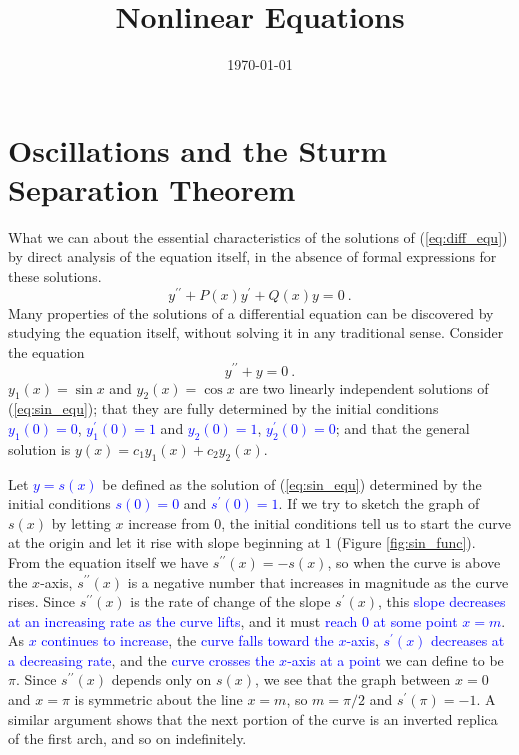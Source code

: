 \documentclass[12pt,a4paper]{article}
\title{Nonlinear Equations}
\author{}
\date{\today}
\begin{document}
\maketitle

\section{Oscillations and the Sturm Separation Theorem}
\cite{george1991differential, simmons2016differential} What we can about the essential characteristics of the solutions of (\ref{eq:diff_equ}) by direct analysis of the equation itself, in the absence of formal expressions for these solutions. 
\begin{equation}
y^{\prime \prime} +P(x) y^\prime +Q(x) y = 0 ~.
\label{eq:diff_equ}
\end{equation}
Many properties of the solutions of a differential equation can be discovered by studying the equation itself, without
solving it in any traditional sense. Consider the equation
\begin{equation}
y^{\prime \prime}  + y = 0 ~.
\label{eq:sin_equ}
\end{equation}
$y_1(x)= \sin x$ and $y_2(x) =\cos x$ are two linearly independent solutions of (\ref{eq:sin_equ}); that they are fully determined by the initial conditions \textcolor{blue}{$y_1(0) = 0$}, \textcolor{blue}{$y_1^\prime(0) = 1$} and \textcolor{blue}{$y_2(0) = 1$}, \textcolor{blue}{$y_2^\prime(0) = 0$}; and that the general solution is $y(x) = c_1y_1(x)+c_2y_2(x)$. 

Let \textcolor{blue}{$y = s(x)$} be defined as the solution of (\ref{eq:sin_equ}) determined by the initial conditions \textcolor{blue}{$s(0) = 0$} and \textcolor{blue}{$s^\prime(0) = 1$}. If we try to sketch the graph of $s(x)$ by letting $x$ increase from $0$, the initial conditions tell us to start the curve at the origin and let it rise with slope beginning at $1$ (Figure \ref{fig:sin_func}). From the equation itself we have $s^{\prime \prime}(x) = -s(x)$, so when the curve is above the $x$-axis, $s^{\prime \prime}(x)$ is a negative number that increases in magnitude as the curve rises. Since $s^{\prime \prime}(x)$ is the rate of change of the slope $s^{\prime}(x)$, this \textcolor{blue}{slope decreases at an increasing rate as the curve lifts}, and it must \textcolor{blue}{reach $0$ at some point $x = m$}. As \textcolor{blue}{$x$ continues to increase}, the \textcolor{blue}{curve falls toward the $x$-axis}, \textcolor{blue}{$s^{\prime}(x)$ decreases at a decreasing rate}, and the \textcolor{blue}{curve crosses the $x$-axis at a point} we can define to be $\pi$. Since $s^{\prime \prime}(x)$ depends only on $s(x)$, we see that the graph between $x = 0$ and $x = \pi$ is symmetric about the line $x = m$, so $m = \pi/2$ and $s^{\prime}(\pi) = -1$. A similar argument shows that the next portion of the curve is an inverted replica of the first arch, and so on indefinitely.
\end{document}
